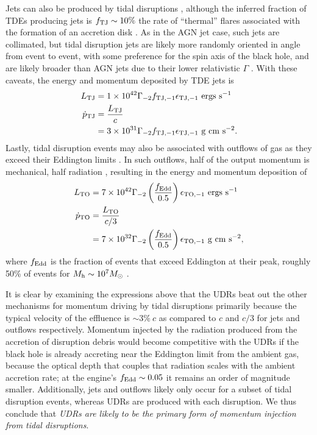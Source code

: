 \documentclass[preprint2]{aastex}
\begin{document}
Jets can also be produced by tidal disruptions \citep{Bloom:2011a}, although the inferred fraction of TDEs producing jets is $f_{\rm TJ} \sim 10\%$ the rate of ``thermal'' flares associated with the formation of an accretion disk \citep{Cenko:2012b}. As in the AGN jet case, such jets are collimated, but tidal disruption jets are likely more randomly oriented in angle from event to event, with some preference for the spin axis of the black hole, and are likely broader than AGN jets due to their lower relativistic $\Gamma$ \citep{Tchekhovskoy:2014a}. With these caveats, the energy and momentum deposited by TDE jets is
\begin{align}
L_{\rm TJ}  &= 1 \times 10^{42} \Gamma_{-2} f_{\rm TJ,-1} \epsilon_{\rm TJ,-1}~{\rm ergs~s}^{-1}\\
\dot{p}_{\rm TJ}  &= \frac{ L_{\rm TJ} }{c}\nonumber\\
&=3 \times 10^{31} \Gamma_{-2} f_{\rm TJ,-1} \epsilon_{\rm TJ,-1}~{\rm g~cm~s}^{-2}.
\end{align}
Lastly, tidal disruption events may also be associated with outflows of gas as they exceed their Eddington limits \citep{Metzger:2015a,Alexander:2016a,Jiang:2016b}. In such outflows, half of the output momentum is mechanical, half radiation \citep{Jiang:2014a}, resulting in the energy and momentum deposition of
\begin{align}
L_{\rm TO}  &= 7 \times 10^{42} \Gamma_{-2} \left(\frac{f_{\rm Edd}}{0.5}\right)\epsilon_{\rm TO,-1}~{\rm ergs~s}^{-1}\\
 \dot{p}_{\rm TO} &= \frac{ L_{\rm TO} }{c/3}\nonumber\\
&= 7 \times 10^{32} \Gamma_{-2} \left(\frac{f_{\rm Edd}}{0.5}\right)\epsilon_{\rm TO,-1}~{\rm g~cm~s}^{-2},
\end{align}
where $f_{\rm Edd}$ is the fraction of events that exceed Eddington at their peak, roughly 50\% of events for $M_{\rm h} \sim 10^{7} M_{\odot}$ \citep{Guillochon:2015b}.

It is clear by examining the expressions above that the UDRs beat out the other mechanisms for momentum driving by tidal disruptions primarily because the typical velocity of the effluence is $\sim 3\%~c$ as compared to $c$ and $c/3$ for jets and outflows respectively. Momentum injected by the radiation produced from the accretion of disruption debris would become competitive with the UDRs if the black hole is already accreting near the Eddington limit from the ambient gas, because the optical depth that couples that radiation scales with the ambient accretion rate; at the engine's $f_{\rm Edd} \sim 0.05$ it remains an order of magnitude smaller. Additionally, jets and outflows likely only occur for a subset of tidal disruption events, whereas UDRs are produced with each disruption. We thus conclude that {\it UDRs are likely to be the primary form of momentum injection from tidal disruptions}.
\end{document}
